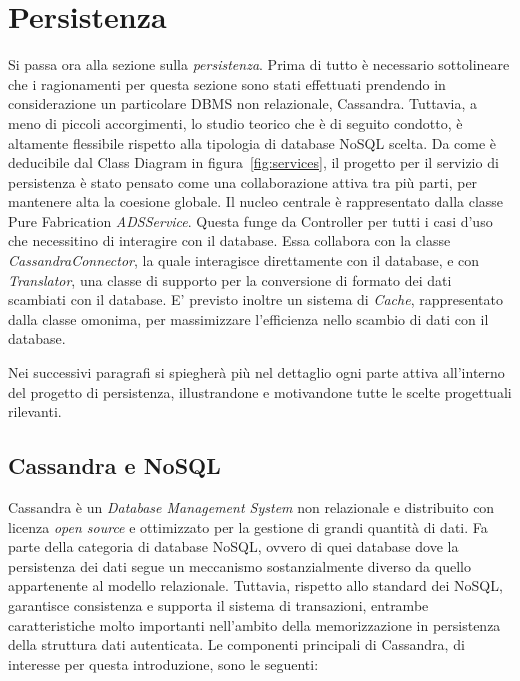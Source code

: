 	
\section{Persistenza}


	Si passa ora alla sezione sulla \textit{persistenza}. Prima di tutto è necessario sottolineare che i ragionamenti per questa sezione sono stati effettuati prendendo in considerazione un particolare DBMS non relazionale, Cassandra. Tuttavia, a meno di piccoli accorgimenti, lo studio teorico che è di seguito condotto, è altamente flessibile rispetto alla tipologia di database NoSQL scelta.
	Da come è deducibile dal Class Diagram in figura~\ref{fig:services}, il progetto per il servizio di persistenza è stato pensato come una collaborazione attiva tra più parti, per mantenere alta la coesione globale.
	Il nucleo centrale è rappresentato dalla classe Pure Fabrication \textit{ADSService}. Questa funge da Controller per tutti i casi d'uso che necessitino di interagire con il database. Essa collabora con la classe \textit{CassandraConnector}, la quale interagisce direttamente con il database, e con \textit{Translator}, una classe di supporto per la conversione di formato dei dati scambiati con il database. E' previsto inoltre un sistema di \textit{Cache}, rappresentato dalla classe omonima, per massimizzare l'efficienza nello scambio di dati con il database.

	Nei successivi paragrafi si spiegherà più nel dettaglio ogni parte attiva all'interno del progetto di persistenza, illustrandone e motivandone tutte le scelte progettuali rilevanti.

	\subsection{Cassandra e NoSQL}
	

		Cassandra è un \textit{Database Management System} non relazionale e distribuito con licenza \textit{open source} e ottimizzato per la gestione di grandi quantità di dati. Fa parte della categoria di database NoSQL, ovvero di quei database dove la persistenza dei dati segue un meccanismo sostanzialmente diverso da quello appartenente al modello relazionale.  Tuttavia, rispetto allo standard dei NoSQL, garantisce consistenza e supporta il sistema di transazioni, entrambe caratteristiche molto importanti nell'ambito della memorizzazione in persistenza della struttura dati autenticata. Le componenti principali di Cassandra, di interesse per questa introduzione, sono le seguenti:
		
